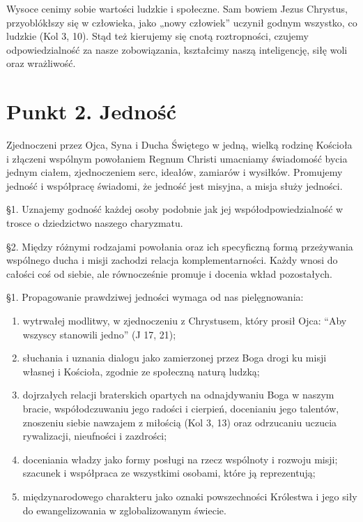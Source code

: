  Wysoce cenimy sobie wartości ludzkie i społeczne. Sam bowiem Jezus Chrystus, przyoblókłszy się w człowieka, jako „nowy człowiek” uczynił godnym wszystko, co ludzkie (Kol 3, 10). Stąd też kierujemy się cnotą roztropności, czujemy odpowiedzialność za nasze zobowiązania, kształcimy naszą inteligencję, siłę woli oraz wrażliwość.


\section{Punkt 2. Jedność}


 
 Zjednoczeni przez Ojca, Syna i Ducha Świętego w jedną, wielką rodzinę Kościoła i złączeni wspólnym powołaniem Regnum Christi umacniamy świadomość bycia jednym ciałem, zjednoczeniem serc, ideałów, zamiarów i wysiłków. Promujemy jedność i współpracę świadomi, że jedność jest misyjna, a misja służy jedności.
 
 
 \S{}1. Uznajemy godność każdej osoby podobnie jak jej współodpowiedzialność w trosce o dziedzictwo naszego charyzmatu.


\S{}2. Między różnymi rodzajami powołania oraz ich specyficzną formą przeżywania wspólnego ducha i misji zachodzi relacja komplementarności. Każdy wnosi do całości coś od siebie, ale równocześnie promuje i  docenia wkład pozostałych.
 
 
 \S{}1. Propagowanie prawdziwej jedności wymaga od nas pielęgnowania:


\begin{enumerate}


\item wytrwałej modlitwy, w zjednoczeniu z Chrystusem, który prosił Ojca: “Aby wszyscy stanowili jedno” (J 17, 21);


\item słuchania i uznania dialogu jako zamierzonej przez Boga drogi ku misji własnej i Kościoła, zgodnie ze społeczną naturą ludzką;


\item dojrzałych relacji braterskich opartych na odnajdywaniu Boga w naszym bracie, współodczuwaniu jego radości i cierpień, docenianiu jego talentów, znoszeniu siebie nawzajem z miłością (Kol 3, 13) oraz odrzucaniu uczucia rywalizacji, nieufności i zazdrości;


\item doceniania władzy jako formy posługi na rzecz wspólnoty i rozwoju misji; szacunek i współpraca ze wszystkimi osobami, które ją reprezentują;


\item międzynarodowego charakteru jako oznaki powszechności Królestwa i jego siły do ewangelizowania w zglobalizowanym świecie.


\end{enumerate}


